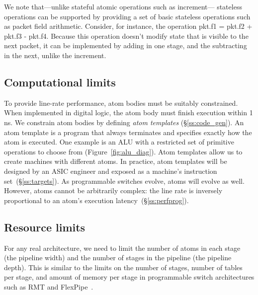 We note that---unlike stateful atomic operations such as increment--- stateless
operations can be supported by providing a set of basic stateless operations
such as packet field arithmetic. Consider, for instance, the operation pkt.f1 =
pkt.f2 + pkt.f3 - pkt.f4. Because this operation doesn't modify state that is
visible to the next packet, it can be implemented by adding in one stage, and
the subtracting in the next, unlike the increment.

\subsection{Computational limits}
\label{s:atomConstraints}


To provide line-rate performance, atom bodies must be suitably constrained.
When implemented in digital logic, the atom body must finish execution within 1
ns. We constrain atom bodies by defining {\it atom templates}
(\S\ref{ss:code_gen}).  An atom template is a program that always terminates
and specifies exactly how the atom is executed. One example is an ALU with a
restricted set of primitive operations to choose from
(Figure~\ref{fig:alu_diag}). Atom templates allow us to create \absmachine
machines with different atoms.  In practice, atom templates will be designed by
an ASIC engineer and exposed as a machine's instruction
set~(\S\ref{ss:targets}).  As programmable switches evolve, atoms will evolve
as well.  However, atoms cannot be arbitrarily complex: the line rate is
inversely proportional to an atom's execution latency~(\S\ref{ss:perfprog}).

\subsection{Resource limits}
\label{s:resource}

For any real architecture, we need to limit the number of atoms in each stage
(the pipeline width) and the number of stages in the pipeline (the pipeline
depth). This is similar to the limits on the number of stages, number of tables
per stage, and amount of memory per stage in programmable switch architectures
such as RMT and FlexPipe~\cite{lavanya_compiler}.
